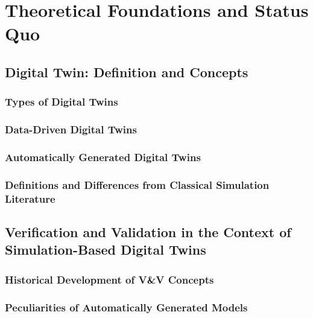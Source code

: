 \chapter{Theoretical Foundations and Status Quo}
\label{chap:theory}

\section{Digital Twin: Definition and Concepts}
\subsection{Types of Digital Twins}

\subsection{Data-Driven Digital Twins}

\subsection{Automatically Generated Digital Twins}
\subsection{Definitions and Differences from Classical Simulation Literature}

\section{Verification and Validation in the Context of Simulation-Based Digital Twins}


\subsection{Historical Development of V\&V Concepts}

\subsection{Peculiarities of Automatically Generated Models}

